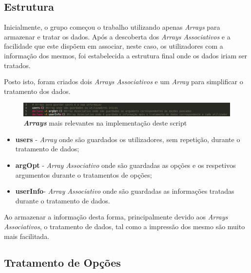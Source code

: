 \documentclass[10pt,portuguese]{article}
\begin{document}
\subsection{Estrutura}
\par Inicialmente, o grupo começou o trabalho utilizando apenas \textit{Arrays} para armazenar e tratar os dados. Após a descoberta dos \textit{Arrays Associativos} e a facilidade que este dispõem em associar, neste caso, os utilizadores com a informação dos mesmos, foi estabelecida a estrutura final onde os dados iriam ser tratados.
\par Posto isto, foram criados dois \textit{Arrays Associativos} e um \textit{Array} para simplificar o tratamento dos dados.

\begin{figure}[!h]
    \centering
    \includegraphics[width=\textwidth]{estrutura.png}
    \caption{\textbf{\textit{Arrays}} mais relevantes na implementação deste script}
\end{figure}
\newline
 \begin{itemize}
   \item {\textbf{users}}   - \textit{Array} onde são guardados os utilizadores, sem repetição, durante o tratamento de dados;
   \\
   \item {\textbf{argOpt}}  - \textit{Array Associativo} onde são guardadas as opções e os respetivos argumentos durante o tratamentos de opções;
   \\
   \item {\textbf{userInfo}}- \textit{Array Associativo} onde são guardadas as informações tratadas durante o tratamento de dados.
 \end{itemize}
\newline
 \par Ao armazenar a informação desta forma, principalmente devido aos \textit{Arrays Associativos}, o tratamento de dados, tal como a impressão dos mesmo são muito mais facilitada.

\clearpage

\subsection{Tratamento de Opções}
\end{document}
